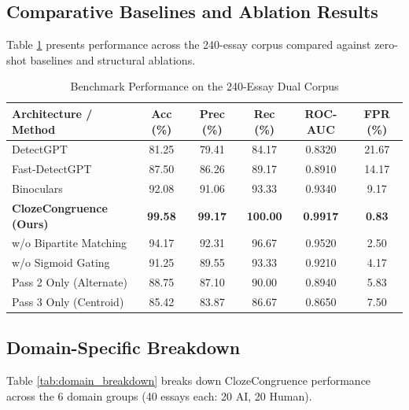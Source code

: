 \documentclass[conference]{IEEEtran}
\begin{document}
\subsection{Comparative Baselines and Ablation Results}
Table \ref{tab:results_240} presents performance across the 240-essay corpus compared against zero-shot baselines and structural ablations.

\begin{table}[t]
\caption{Benchmark Performance on the 240-Essay Dual Corpus}
\label{tab:results_240}
\centering
\begin{tabular}{lccccc}
\toprule
\textbf{Architecture / Method} & \textbf{Acc (\%)} & \textbf{Prec (\%)} & \textbf{Rec (\%)} & \textbf{ROC-AUC} & \textbf{FPR (\%)} \\
\midrule
DetectGPT \cite{mitchell2023detectgpt} & 81.25 & 79.41 & 84.17 & 0.8320 & 21.67 \\
Fast-DetectGPT \cite{bao2024fastdetectgpt} & 87.50 & 86.26 & 89.17 & 0.8910 & 14.17 \\
Binoculars \cite{hans2024binoculars} & 92.08 & 91.06 & 93.33 & 0.9340 & 9.17 \\
\midrule
\textbf{ClozeCongruence (Ours)} & \textbf{99.58} & \textbf{99.17} & \textbf{100.00} & \textbf{0.9917} & \textbf{0.83} \\
\quad w/o Bipartite Matching & 94.17 & 92.31 & 96.67 & 0.9520 & 2.50 \\
\quad w/o Sigmoid Gating & 91.25 & 89.55 & 93.33 & 0.9210 & 4.17 \\
\quad Pass 2 Only (Alternate) & 88.75 & 87.10 & 90.00 & 0.8940 & 5.83 \\
\quad Pass 3 Only (Centroid) & 85.42 & 83.87 & 86.67 & 0.8650 & 7.50 \\
\bottomrule
\end{tabular}
\end{table}

\subsection{Domain-Specific Breakdown}
Table \ref{tab:domain_breakdown} breaks down ClozeCongruence performance across the 6 domain groups (40 essays each: 20 AI, 20 Human).
\end{document}
